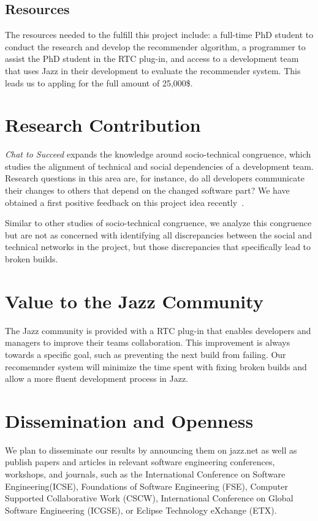 \documentclass{sig-alternate}
\begin{document}
\subsection{Resources}
The resources needed to the fulfill this project include: a full-time PhD student
to conduct the research and develop the recommender algorithm, a programmer to
assist the PhD student in the RTC plug-in, and access to a development team
that uses Jazz in their development to evaluate the recommender system. This
leads us to appling for the full amount of 25,000\$.

\section{Research Contribution}
\emph{Chat to Succeed} expands the knowledge around socio-technical congruence, which studies the alignment of technical and social dependencies of a development team. 
Research questions in this area are, for instance, do all developers
communicate their changes to others that depend on the changed software part?
We have obtained a first positive feedback
on this project idea recently~\cite{schroeter:2008rsse}.

Similar to other studies of socio-technical congruence, we analyze this
congruence but are not as concerned with identifying all
discrepancies between the social and technical networks in the project, but
those discrepancies that specifically lead to broken builds.

\section{Value to the Jazz Community}
The Jazz community is provided with a RTC plug-in that enables developers and managers to improve their teams collaboration.
This improvement is always towards a specific goal, such as preventing the next build from failing.
Our recomemnder system will minimize the time spent with fixing
broken builds and allow a more fluent development process in Jazz.

\section{Dissemination and Openness}
We plan to disseminate our results by announcing them on jazz.net as well as
publish papers and articles in relevant software engineering conferences,
workshops, and journals, such as the International Conference on Software
Engineering(ICSE), Foundations of Software Engineering (FSE), Computer Supported
Collaborative Work (CSCW), International Conference on Global Software
Engineering (ICGSE), or Eclipse Technology eXchange (ETX).
\end{document}
